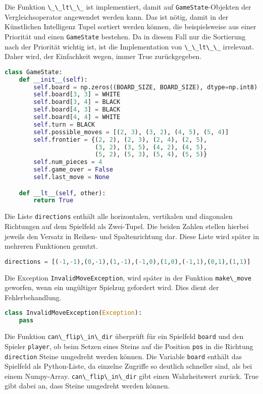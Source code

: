 Die Funktion \passthrough{\lstinline!\_\_lt\_\_!} ist implementiert,
damit auf \passthrough{\lstinline!GameState!}-Objekten der
Vergleichsoperator angewendet werden kann. Das ist nötig, damit in der
Künstlichen Intelligenz Tupel sortiert werden können, die beispielsweise
aus einer Priorität und einen \passthrough{\lstinline!GameState!}
bestehen. Da in diesem Fall nur die Sortierung nach der Priorität
wichtig ist, ist die Implementation von
\passthrough{\lstinline!\_\_lt\_\_!} irrelevant. Daher wird, der
Einfachkeit wegen, immer True zurückgegeben.

\begin{lstlisting}[language=Python]
class GameState:
    def __init__(self):
        self.board = np.zeros((BOARD_SIZE, BOARD_SIZE), dtype=np.int8)
        self.board[3, 3] = WHITE
        self.board[3, 4] = BLACK
        self.board[4, 3] = BLACK
        self.board[4, 4] = WHITE
        self.turn = BLACK
        self.possible_moves = [(2, 3), (3, 2), (4, 5), (5, 4)]
        self.frontier = {(2, 2), (2, 3), (2, 4), (2, 5),
                         (3, 2), (3, 5), (4, 2), (4, 5),
                         (5, 2), (5, 3), (5, 4), (5, 5)}
        self.num_pieces = 4
        self.game_over = False
        self.last_move = None

    def __lt__(self, other):
        return True
\end{lstlisting}

Die Liste \passthrough{\lstinline!directions!} enthält alle
horizontalen, vertikalen und diagonalen Richtungen auf dem Spielfeld als
Zwei-Tupel. Die beiden Zahlen stellen hierbei jeweils den Versatz in
Reihen- und Spaltenrichtung dar. Diese Liste wird später in mehreren
Funktionen genutzt.

\begin{lstlisting}[language=Python]
directions = [(-1,-1),(0,-1),(1,-1),(-1,0),(1,0),(-1,1),(0,1),(1,1)]
\end{lstlisting}

Die Exception \passthrough{\lstinline!InvalidMoveException!}, wird
später in der Funktion \passthrough{\lstinline!make\_move!} geworfen,
wenn ein ungültiger Spielzug gefordert wird. Dies dient der
Fehlerbehandlung.

\begin{lstlisting}[language=Python]
class InvalidMoveException(Exception):
    pass
\end{lstlisting}

Die Funktion \passthrough{\lstinline!can\_flip\_in\_dir!} überprüft für
ein Spielfeld \passthrough{\lstinline!board!} und den Spieler
\passthrough{\lstinline!player!}, ob beim Setzen eines Steins auf die
Position \passthrough{\lstinline!pos!} in die Richtung
\passthrough{\lstinline!direction!} Steine umgedreht werden können. Die
Variable \passthrough{\lstinline!board!} enthält das Spielfeld als
Python-Liste, da einzelne Zugriffe so deutlich schneller sind, als bei
einem Numpy-Array. \passthrough{\lstinline!can\_flip\_in\_dir!} gibt
einen Wahrheitswert zurück. True gibt dabei an, dass Steine umgedreht
werden können.

